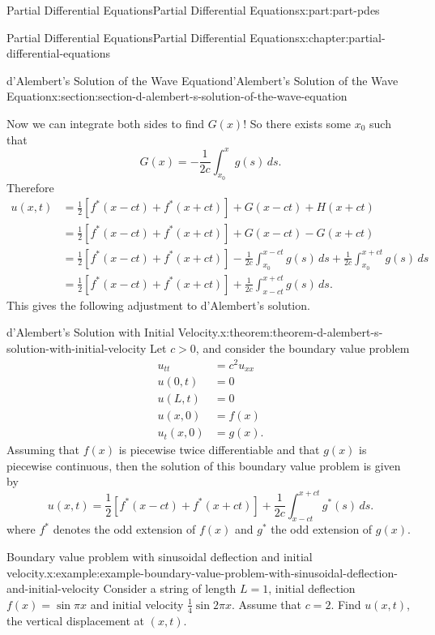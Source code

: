 \documentclass[oneside,10pt,]{book}
\numberwithin{equation}{part}
\newcommand{\gt}{>}
\newcommand{\amp}{&}
\begin{document}
\begin{partptx}{Partial Differential Equations}{}{Partial Differential Equations}{}{}{x:part:part-pdes}
\begin{chapterptx}{Partial Differential Equations}{}{Partial Differential Equations}{}{}{x:chapter:partial-differential-equations}
\begin{sectionptx}{d'Alembert's Solution of the Wave Equation}{}{d'Alembert's Solution of the Wave Equation}{}{}{x:section:section-d-alembert-s-solution-of-the-wave-equation}
%
\par
Now we can integrate both sides to find \(G(x)\)! So there exists some \(x_{0}\) such that%
\begin{equation*}
G(x) = -\frac{1}{2c}\int_{x_{0}}^{x}g(s)\,ds.
\end{equation*}
Therefore%
\begin{align*}
u(x,t) \amp = \frac{1}{2}[f^{*}(x-ct)+f^{*}(x+ct)] + G(x-ct) + H(x+ct) \\
\amp = \frac{1}{2}[f^{*}(x-ct)+f^{*}(x+ct)] + G(x-ct) - G(x+ct) \\
\amp = \frac{1}{2}[f^{*}(x-ct)+f^{*}(x+ct)] - \frac{1}{2c}\int_{x_{0}}^{x-ct}g(s)\,ds + \frac{1}{2c}\int_{x_{0}}^{x+ct}g(s)\,ds \\
\amp = \frac{1}{2}[f^{*}(x-ct)+f^{*}(x+ct)] + \frac{1}{2c}\int_{x-ct}^{x+ct}g(s)\,ds \text{.}
\end{align*}
This gives the following adjustment to d'Alembert's solution.%
\begin{theorem}{d'Alembert's Solution with Initial Velocity.}{}{x:theorem:theorem-d-alembert-s-solution-with-initial-velocity}%
%
Let \(c\gt0\), and consider the boundary value problem%
%
\begin{align*}
u_{tt} \amp = c^{2}u_{xx} \\
u(0,t) \amp = 0 \\
u(L,t) \amp = 0 \\
u(x,0) \amp = f(x) \\
u_{t}(x,0) \amp = g(x). 
\end{align*}
Assuming that \(f(x)\) is piecewise twice differentiable and that \(g(x)\) is piecewise continuous, then the solution of this boundary value problem is given by%
\begin{equation*}
u(x,t) = \frac{1}{2}[f^{*}(x-ct)+f^{*}(x+ct)] + \frac{1}{2c}\int_{x-ct}^{x+ct}g^{*}(s)\,ds.
\end{equation*}
where \(f^{*}\) denotes the odd extension of \(f(x)\) and \(g^{*}\) the odd extension of \(g(x)\).%
\end{theorem}
\begin{example}{Boundary value problem with sinusoidal deflection and initial velocity.}{x:example:example-boundary-value-problem-with-sinusoidal-deflection-and-initial-velocity}%
Consider a string of length \(L=1\), initial deflection \(f(x) = \sin\pi x\) and initial velocity \(\frac{1}{4}\sin2\pi x\). Assume that \(c = 2\). Find \(u(x,t)\), the vertical displacement at \((x,t)\).%
\par\smallskip%

\end{example}
\end{sectionptx}
\end{chapterptx}
\end{partptx}
\end{document}
